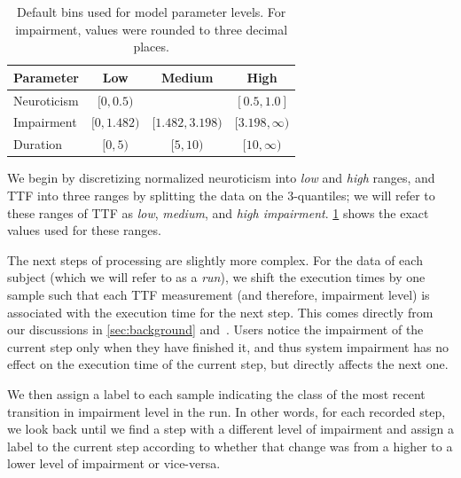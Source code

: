 \begin{table}[]
    \centering
    \caption{%
        Default bins used for model parameter levels.
        For impairment, values were rounded to three decimal places.
    }
    \label{tab:defaultbins}
    \begin{tabular}{@{}lccc@{}}
        \toprule
        \textbf{Parameter} & \textbf{Low}     & \textbf{Medium}      & \textbf{High}         \\ \midrule
        Neuroticism        & \( [0, 0.5) \)   &                      & \( [0.5, 1.0] \)      \\
        Impairment         & \( [0, 1.482) \) & \( [1.482, 3.198) \) & \( [3.198, \infty) \) \\
        Duration           & \( [0, 5) \)     & \( [5, 10) \)        & \( [10, \infty) \)    \\ \bottomrule
    \end{tabular}%
\end{table}

We begin by discretizing normalized neuroticism into \emph{low} and \emph{high} ranges, and \ac{TTF} into three ranges by splitting the data on the 3-quantiles; we will refer to these ranges of \ac{TTF} as \emph{low}, \emph{medium}, and \emph{high impairment}.
\cref{tab:defaultbins} shows the exact values used for these ranges.

The next steps of processing are slightly more complex.
For the data of each subject (which we will refer to as a \emph{run}), we shift the execution times by one sample such that each \ac{TTF} measurement (and therefore, impairment level) is associated with the execution time for the next step.
This comes directly from our discussions in \cref{sec:background} and~\cite{olguinmunoz:impact2021}.
Users notice the impairment of the current step only when they have finished it, and thus system impairment has no effect on the execution time of the current step, but directly affects the next one.

We then assign a label to each sample indicating the class of the most recent transition in impairment level in the run.
In other words, for each recorded step, we look back until we find a step with a different level of impairment and assign a label to the current step according to whether that change was from a higher to a lower level of impairment or vice-versa.

